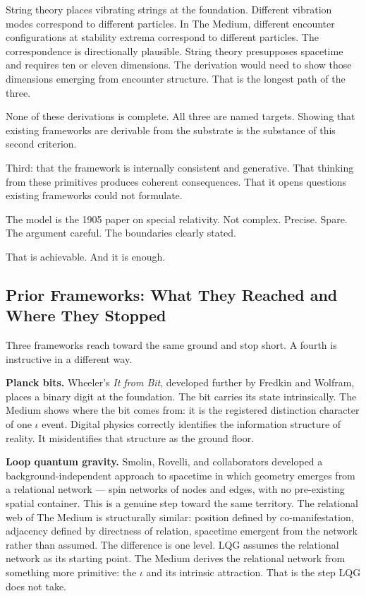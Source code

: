 \documentclass[11pt,letterpaper]{article}
\begin{document}
String theory places vibrating strings at the foundation. Different vibration modes correspond to different particles. In The Medium, different encounter configurations at stability extrema correspond to different particles. The correspondence is directionally plausible. String theory presupposes spacetime and requires ten or eleven dimensions. The derivation would need to show those dimensions emerging from encounter structure. That is the longest path of the three.

None of these derivations is complete. All three are named targets. Showing that existing frameworks are derivable from the substrate is the substance of this second criterion.

Third: that the framework is internally consistent and generative. That thinking from these primitives produces coherent consequences. That it opens questions existing frameworks could not formulate.

The model is the 1905 paper on special relativity. Not complex. Precise. Spare. The argument careful. The boundaries clearly stated.

That is achievable. And it is enough.

\subsection{Prior Frameworks: What They Reached and Where They Stopped}
\label{sec:orgb33c35a}

Three frameworks reach toward the same ground and stop short. A fourth is instructive in a different way.

\textbf{Planck bits.} Wheeler's \emph{It from Bit}, developed further by Fredkin and Wolfram, places a binary digit at the foundation. The bit carries its state intrinsically. The Medium shows where the bit comes from: it is the registered distinction character of one \(\iota\) event. Digital physics correctly identifies the information structure of reality. It misidentifies that structure as the ground floor.

\textbf{Loop quantum gravity.} Smolin, Rovelli, and collaborators developed a background-independent approach to spacetime in which geometry emerges from a relational network --- spin networks of nodes and edges, with no pre-existing spatial container. This is a genuine step toward the same territory. The relational web of The Medium is structurally similar: position defined by co-manifestation, adjacency defined by directness of relation, spacetime emergent from the network rather than assumed. The difference is one level. LQG assumes the relational network as its starting point. The Medium derives the relational network from something more primitive: the \(\iota\) and its intrinsic attraction. That is the step LQG does not take.
\end{document}
